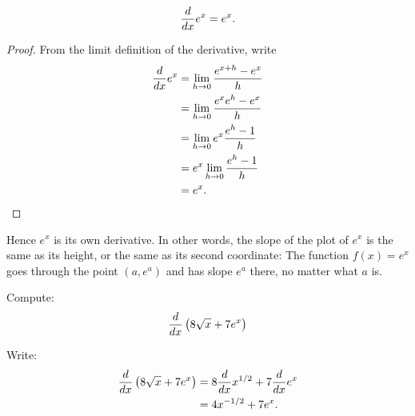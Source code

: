 \begin{mainTheorem}
\[
\frac{d}{dx} e^x = e^x.
\]
\end{mainTheorem}
\begin{proof}  
From the limit definition of the derivative, write
\begin{align*}
\frac{d}{dx} e^x&=\lim_{h\to 0} \frac{e^{x+h}-e^x}{h} \\
&=\lim_{h\to 0} \frac{e^xe^{h}-e^x}{h} \\
&=\lim_{h\to 0} e^x\frac{e^{h}-1}{h} \\
&=e^x\lim_{h\to 0} \frac{e^{h}-1}{h} \\
&=e^x.
\end{align*}
\end{proof}



Hence $e^x$ is its own derivative. In other words, the slope of the
plot of $e^x$ is the same as its height, or the same as its second
coordinate: The function $ f(x)=e^x$ goes through the point $ (a,e^a)$
and has slope $e^a$ there, no matter what $a$ is. 



\begin{example}
Compute:
\[
\frac{d}{dx}\left(8\sqrt{x} + 7e^x \right)
\]
\end{example}

\begin{solution}
Write:
\begin{align*}
\frac{d}{dx}\left(8\sqrt{x} + 7e^x \right) &= 8\frac{d}{dx} x^{1/2} + 7\frac{d}{dx} e^x\\
&= 4x^{-1/2} + 7 e^x.
\end{align*}
\end{solution}


